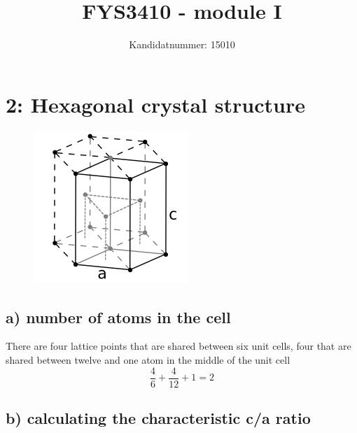 \documentclass[a4paper, 11pt]{article}
\author{Kandidatnummer: 15010}
\title{FYS3410 - module I}
\begin{document}
\maketitle
	\section*{2: Hexagonal crystal structure}
		\begin{figure}[H]
			\includegraphics{hcp.png}
		\end{figure}
		\subsection*{a) number of atoms in the cell}
			There are four lattice points that are shared between six unit cells, four that are shared between twelve and one atom in the middle of the unit cell
			$$\frac{4}{6}+\frac{4}{12}+1 = 2$$
		\subsection*{b) calculating the characteristic c/a ratio}
			
\end{document}

